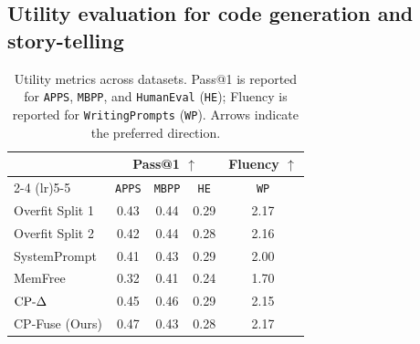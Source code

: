 \subsection{Utility evaluation for code generation and story-telling}
\label{sec:utility_exps}

\begin{table}[t!]
\caption{Utility metrics across datasets. Pass@1 is reported for \texttt{APPS}, \texttt{MBPP}, and \texttt{HumanEval} (\texttt{HE}); Fluency is reported for \texttt{WritingPrompts} (\texttt{WP}). Arrows indicate the preferred direction.}
\centering
\begin{tabular}{lcccc}
\toprule
\textbf{} & \multicolumn{3}{c}{\textbf{Pass@1} $\uparrow$} & \textbf{Fluency} $\uparrow$ \\
\cmidrule(lr){2-4} \cmidrule(lr){5-5}
& \texttt{APPS} & \texttt{MBPP} & \texttt{HE} & \texttt{WP} \\
\midrule
Overfit Split 1 & 0.43 & 0.44 & 0.29 & 2.17  \\
Overfit Split 2 & 0.42 & 0.44 & 0.28 & 2.16  \\
\midrule
SystemPrompt & 0.41 & 0.43 & 0.29 & 2.00  \\
MemFree & 0.32 & 0.41 & 0.24 & 1.70  \\
$\text{CP-}\Delta$ & 0.45 & 0.46 & 0.29 & 2.15 \\
CP-Fuse (Ours) & 0.47 & 0.43 & 0.28 & 2.17  \\
\bottomrule
\end{tabular}
\label{tab:results_utility}
\end{table}


